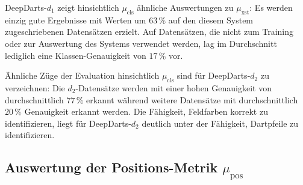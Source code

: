 DeepDarts-$d_1$ zeigt hinsichtlich $\mu_\text{cls}$ ähnliche Auswertungen zu $\mu_\text{xst}$: Es werden einzig gute Ergebnisse mit Werten um $63\,\%$ auf den diesem System zugeschriebenen Datensätzen erzielt. Auf Datensätzen, die nicht zum Training oder zur Auswertung des Systems verwendet werden, lag im Durchschnitt lediglich eine Klassen-Genauigkeit von $17\,\%$ vor.

Ähnliche Züge der Evaluation hinsichtlich $\mu_\text{cls}$ sind für DeepDarts-$d_2$ zu verzeichnen: Die $d_2$-Datensätze werden mit einer hohen Genauigkeit von durchschnittlich $77\,\%$ erkannt während weitere Datensätze mit durchschnittlich $20\,\%$ Genauigkeit erkannt werden. Die Fähigkeit, Feldfarben korrekt zu identifizieren, liegt für DeepDarts-$d_2$ deutlich unter der Fähigkeit, Dartpfeile zu identifizieren.


\vspace*{3em}
\subsection{Auswertung der Positions-Metrik \texorpdfstring{$\mu_\text{pos}$}{µ\_pos}}
\label{sec:auswertung_pos}

\NNPos

